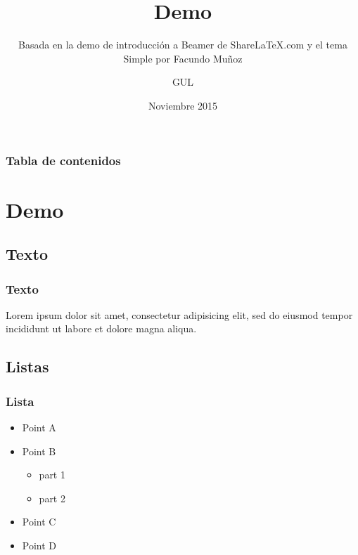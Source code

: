 \documentclass[aspectratio=43]{beamer}
\title{Demo} %
\subtitle{Basada en la demo de introducción a Beamer de ShareLaTeX.com y el tema Simple por Facundo Muñoz} %
\author{GUL} %
\institute{\edicion Jornadas Técnicas del GUL} %
\date{Noviembre 2015} %
\begin{document}
{
    \begin{frame}
        \titlepage
    \end{frame}
}
\addtocounter{framenumber}{-1}



\begin{frame}
    \frametitle{Tabla de contenidos} %
    \tableofcontents
\end{frame}

\section{Demo}

\subsection{Texto}

\begin{frame}
    \frametitle{Texto}
    Lorem ipsum dolor sit amet, consectetur adipisicing elit, sed do eiusmod tempor incididunt ut labore et dolore magna aliqua.
\end{frame}

\subsection{Listas}

\begin{frame}
    \frametitle{Lista}
    \begin{itemize}
    \item Point A
    \item Point B
    \begin{itemize}
        \item part 1
        \item part 2
    \end{itemize}
    \item Point C
    \item Point D
    \end{itemize}
\end{frame}
\end{document}
